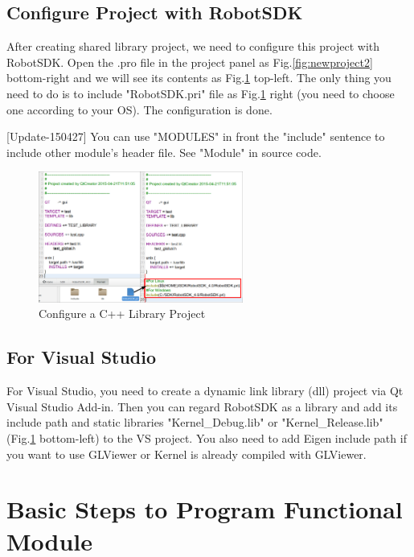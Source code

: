 \documentclass[a4paper,10pt]{book}
\begin{document}
\subsection{Configure Project with RobotSDK}

After creating shared library project, we need to configure this project with RobotSDK. Open the .pro file in the project panel as Fig.\ref{fig:newproject2} bottom-right and we will see its contents as Fig.\ref{fig:configproject1} top-left. The only thing you need to do is to include "RobotSDK.pri" file as Fig.\ref{fig:configproject1} right (you need to choose one according to your OS). The configuration is done.

[Update-150427] You can use "MODULES" in front the "include" sentence to include other module's header file. See "Module" in source code. 

\begin{figure}
 \centering
 \includegraphics[width=0.6\textwidth]{img/configproject1.eps}
 \caption{Configure a C++ Library Project}
 \label{fig:configproject1}
\end{figure}

\subsection{For Visual Studio}

For Visual Studio, you need to create a dynamic link library (dll) project via Qt Visual Studio Add-in. Then you can regard RobotSDK as a library and add its include path and static libraries "Kernel\_Debug.lib" or "Kernel\_Release.lib" (Fig.\ref{fig:configproject1} bottom-left) to the VS project. You also need to add Eigen include path if you want to use GLViewer or Kernel is already compiled with GLViewer.

\section{Basic Steps to Program Functional Module}
\end{document}
